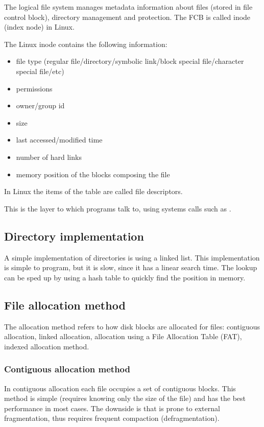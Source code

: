 The logical file system manages metadata information about files (stored in file control block), directory management and protection. The FCB is called inode (index node) in Linux.

The Linux inode contains the following information:
\begin{itemize}
    \item file type (regular file/directory/symbolic link/block special file/character special file/etc)
    \item permissions
    \item owner/group id
    \item size
    \item last accessed/modified time
    \item number of hard links
    \item memory position of the blocks composing the file
\end{itemize}
In Linux the items of the table are called file descriptors.


This is the layer to which programs talk to, using systems calls such as .

\subsection{Directory implementation}
A simple implementation of directories is using a linked list. This implementation is simple to program, but it is slow, since it has a linear search time. The lookup can be sped up by using a hash table to quickly find the position in memory.


\subsection{File allocation method}
The allocation method refers to how disk blocks are allocated for files: contiguous allocation, linked allocation, allocation using a File Allocation Table (FAT), indexed allocation method.

\subsubsection{Contiguous allocation method}
In contiguous allocation each file occupies a set of contiguous blocks. This method is simple (requires knowing only the size of the file)  and has the best performance in most cases. The downside is that is prone to external fragmentation, thus requires frequent compaction (defragmentation).

